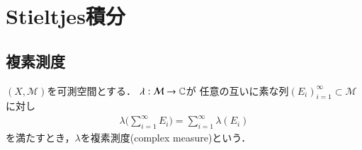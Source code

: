 \section{Stieltjes積分}
	\subsection{複素測度}

	\begin{screen}
		\begin{dfn}[複素測度]
			$(X,\mathcal{M})$を可測空間とする．
			$\lambda: \mathcal{M} \rightarrow \mathbb{C}$が
			任意の互いに素な列$(E_i)_{i=1}^{\infty} \subset \mathcal{M}$に対し
			\begin{align}
				\lambda\biggl( \sum_{i=1}^{\infty} E_i \biggr) = \sum_{i=1}^{\infty} \lambda(E_i)
				\label{eq:dfn_complex_measure}
			\end{align}
			を満たすとき，$\lambda$を複素測度(complex measure)という．
		\end{dfn}
	\end{screen}
	
